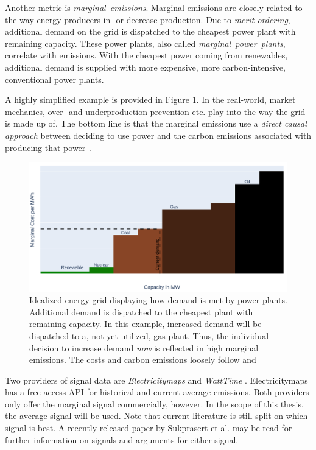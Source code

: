 Another metric is \emph{marginal~emissions}. 
Marginal emissions are closely related to the way energy producers in- or decrease production.
Due to \emph{merit-ordering}, additional demand on the grid is dispatched to the cheapest power plant with remaining capacity.
These power plants, also called \emph{marginal~power~plants}, correlate with emissions. 
With the cheapest power coming from renewables, additional demand is supplied with more expensive, more carbon-intensive, conventional power plants.

A highly simplified example is provided in Figure \ref{fig:marginal_example}.
In the real-world, market mechanics, over- and underproduction prevention etc. play into the way the grid is made up of.
The bottom line is that the marginal emissions use a \emph{direct causal approach} between deciding to use power and the carbon emissions associated with producing that power~. 

\begin{figure}
    \includegraphics[width=\linewidth]{notebooks/marginal_emissions.pdf}
    \caption[short]{
        Idealized energy grid displaying how demand is met by power plants. 
        Additional demand is dispatched to the cheapest plant with remaining capacity. 
        In this example, increased demand will be dispatched to a, not yet utilized, gas plant.
        Thus, the individual decision to increase demand \emph{now} is reflected in high marginal emissions.
        The costs and carbon emissions loosely follow  and  
        }
    \label{fig:marginal_example}
\end{figure}

Two providers of signal data are \emph{Electricitymaps}  and \emph{WattTime} .
Electricitymaps has a free access API for historical and current average emissions. Both providers only offer the marginal signal commercially, however. 
In the scope of this thesis, the average signal will be used. 
Note that current literature is still split on which signal is best. 
A recently released paper by Sukprasert et al. \cite{sukprasert_limitations_2024} may be read for further information on signals and arguments for either signal.

